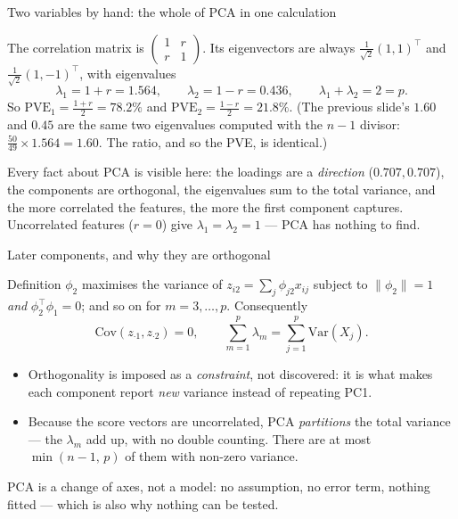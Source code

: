 \documentclass[aspectratio=169,11pt]{beamer}
\begin{document}
\begin{frame}{Two variables by hand: the whole of PCA in one calculation}
  \footnotesize
  \begin{numexample}[{{Murder and Rape, standardised, $r=0.564$}}]
    The correlation matrix is $\begin{pmatrix}1 & r\\ r & 1\end{pmatrix}$. Its eigenvectors
    are always $\tfrac{1}{\sqrt2}(1,1)^\top$ and $\tfrac{1}{\sqrt2}(1,-1)^\top$, with
    eigenvalues
    \[
      \lambda_1 = 1+r = 1.564, \qquad \lambda_2 = 1-r = 0.436 ,
      \qquad \lambda_1+\lambda_2 = 2 = p .
    \]
    So $\mathrm{PVE}_1=\tfrac{1+r}{2}=78.2\%$ and $\mathrm{PVE}_2=\tfrac{1-r}{2}=21.8\%$.
    (The previous slide's $1.60$ and $0.45$ are the same two eigenvalues computed with the
    $n-1$ divisor: $\tfrac{50}{49}\times1.564=1.60$. The ratio, and so the PVE, is identical.)
  \end{numexample}
  \begin{takeaway}
    Every fact about PCA is visible here: the loadings are a \emph{direction}
    ($0.707,0.707$), the components are orthogonal, the eigenvalues sum to the total
    variance, and the more correlated the features, the more the first component captures.
    Uncorrelated features ($r=0$) give $\lambda_1=\lambda_2=1$ --- PCA has nothing to
    find.
  \end{takeaway}
\end{frame}

\begin{frame}{Later components, and why they are orthogonal}
  \footnotesize
  \begin{block}{Definition}
    $\phi_2$ maximises the variance of $z_{i2}=\sum_j\phi_{j2}x_{ij}$ subject to
    $\|\phi_2\|=1$ \emph{and} $\phi_2^\top\phi_1=0$; and so on for $m=3,\dots,p$.
    Consequently
    \[
      \mathrm{Cov}(z_{\cdot 1}, z_{\cdot 2}) = 0,
      \qquad \sum_{m=1}^{p}\lambda_m = \sum_{j=1}^{p}\mathrm{Var}(X_j) .
    \]
  \end{block}
  \begin{readme}
    \begin{itemize}
      \item Orthogonality is imposed as a \emph{constraint}, not discovered: it is what
            makes each component report \emph{new} variance instead of repeating PC1.
      \item Because the score vectors are uncorrelated, PCA \emph{partitions} the total
            variance --- the $\lambda_m$ add up, with no double counting. There are at most
            $\min(n-1,\,p)$ of them with non-zero variance.
    \end{itemize}
  \end{readme}
  \begin{takeaway}
    PCA is a change of axes, not a model: no assumption, no error term, nothing fitted ---
    which is also why nothing can be tested.
  \end{takeaway}
\end{frame}
\end{document}
